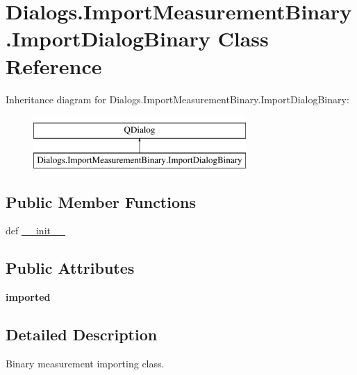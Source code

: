 \hypertarget{classDialogs_1_1ImportMeasurementBinary_1_1ImportDialogBinary}{\section{Dialogs.\-Import\-Measurement\-Binary.\-Import\-Dialog\-Binary Class Reference}
\label{classDialogs_1_1ImportMeasurementBinary_1_1ImportDialogBinary}
}
Inheritance diagram for Dialogs.\-Import\-Measurement\-Binary.\-Import\-Dialog\-Binary\-:\begin{figure}[H]
\begin{center}
\leavevmode
\includegraphics[height=2.000000cm]{classDialogs_1_1ImportMeasurementBinary_1_1ImportDialogBinary}
\end{center}
\end{figure}
\subsection*{Public Member Functions}
\begin{DoxyCompactItemize}
\item 
def \hyperlink{classDialogs_1_1ImportMeasurementBinary_1_1ImportDialogBinary_a9aaaf65a7428c5b1179b7fc0a8609cdb}{\-\_\-\-\_\-init\-\_\-\-\_\-}
\end{DoxyCompactItemize}
\subsection*{Public Attributes}
\begin{DoxyCompactItemize}
\item 
\hypertarget{classDialogs_1_1ImportMeasurementBinary_1_1ImportDialogBinary_aaae1d38eee314ce24667545682f2160c}{{\bfseries imported}}\label{classDialogs_1_1ImportMeasurementBinary_1_1ImportDialogBinary_aaae1d38eee314ce24667545682f2160c}

\end{DoxyCompactItemize}


\subsection{Detailed Description}
\begin{DoxyVerb}Binary measurement importing class.
\end{DoxyVerb}
 

